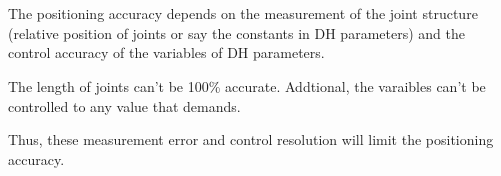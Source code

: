 \documentclass[a4paper,11pt]{article}
\begin{document}
\section{}
The positioning accuracy depends on the measurement of the joint structure (relative position of joints or say the constants in DH parameters) and the control accuracy of the variables of DH parameters.

The length of joints can't be 100\% accurate. Addtional, the varaibles can't be controlled to any value that demands. 

Thus, these measurement error and control resolution will limit the positioning accuracy.
\end{document}

